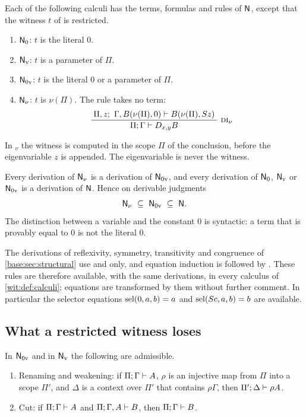 \begin{definition}
\label{wit:def:calculi}
Each of the following calculi has the terms, formulas and rules of $\mathsf{N}$,
except that the witness $t$ of  is restricted.
\begin{enumerate}[label=\textup{(\roman*)}]
\item $\mathsf{N}_{0}$: $t$ is the literal $0$.
\item $\mathsf{N}_{\mathrm v}$: $t$ is a parameter of $\Pi$.
\item $\mathsf{N}_{0\mathrm v}$: $t$ is the literal $0$ or a parameter of $\Pi$.
\item $\mathsf{N}_{\nu}$: $t$ is $\nu(\Pi)$.  The rule takes no term:
\[
 \infrule{\Pi,z;\ \Gamma,B(\nu(\Pi),0)\proves B(\nu(\Pi),\Suc z)}
         {\Pi;\Gamma\proves\D{x}{y}B}\ \rulename{DI}_{\nu}
\]
\end{enumerate}
In $_\nu$ the witness is computed in the scope $\Pi$ of the
conclusion, before the eigenvariable $z$ is appended.  The eigenvariable is
never the witness.
\end{definition}

Every derivation of $\mathsf{N}_{\nu}$ is a derivation of $\mathsf{N}_{0\mathrm v}$, and
every derivation of $\mathsf{N}_{0}$, $\mathsf{N}_{\mathrm v}$ or $\mathsf{N}_{0\mathrm v}$ is
a derivation of $\mathsf{N}$.  Hence on derivable judgments
\begin{equation}
 \Nat_{\nu}\ \subseteq\ \Nat_{0\mathrm v}\ \subseteq\ \Nat .
 \label{wit:eq:sandwich}
\end{equation}
The distinction between a variable and the constant $0$ is syntactic: a
term that is provably equal to $0$ is not the literal $0$.

The derivations of reflexivity, symmetry, transitivity and congruence of
\cref{base:sec:structural} use  and  only, and
equation induction is  followed by .  These rules
are therefore available, with the same derivations, in every calculus of
\cref{wit:def:calculi}; equations are transformed by them without further
comment.  In particular the selector equations $\operatorname{sel}(0,a,b)=a$ and
$\operatorname{sel}(S c,a,b)=b$ are available.

\subsection{What a restricted witness loses}

\begin{lemma}
\label{wit:lem:structural-0v}
In $\mathsf{N}_{0\mathrm v}$ and in $\mathsf{N}_{\mathrm v}$ the following are
admissible.
\begin{enumerate}[label=\textup{(\roman*)}]
\item Renaming and weakening: if $\Pi;\Gamma\vdash A$, $\rho$ is an
 injective map from $\Pi$ into a scope $\Pi'$, and $\Delta$ is a context
 over $\Pi'$ that contains $\rho\Gamma$, then $\Pi';\Delta\vdash\rho A$.
\item Cut: if $\Pi;\Gamma\vdash A$ and $\Pi;\Gamma,A\vdash B$, then
 $\Pi;\Gamma\vdash B$.
\end{enumerate}
\end{lemma}


